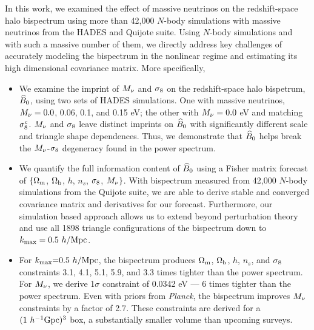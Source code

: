 In this work, we examined the effect of massive neutrinos on the redshift-space 
halo bispectrum using more than 42,000 $N$-body simulations with massive neutrinos
from the HADES and Quijote suite. Using $N$-body simulations and with such a massive 
number of them, we directly address key challenges of accurately modeling the 
bispectrum in the nonlinear regime and estimating its high dimensional covariance 
matrix. More specifically, 
\begin{itemize}
    \item We examine the imprint of $M_\nu$ and $\sigma_8$ on the redshift-space halo bispetrum, 
        $\widehat{B}_0$, using two sets of HADES simulations. One with massive neutrinos, $M_\nu = 0.0$, 0.06, 
        0.1, and 0.15 eV; the other with $M_\nu = 0.0$ eV and matching $\sigma_8^{c}$. 
        $M_\nu$ and $\sigma_8$ leave distinct imprints on $\widehat{B}_0$ with significantly different 
        scale and triangle shape dependences. Thus, we demonstrate that $\widehat{B}_0$ helps 
        break the $M_\nu$-$\sigma_8$ degeneracy found in the power spectrum. 
    \item We quantify the full information content of $\widehat{B}_0$ using a Fisher matrix forecast of 
        $\{\Omega_{\rm m}$, $\Omega_{\rm b}$, $h$, $n_s$, $\sigma_8$, $M_\nu\}$. With bispectrum measured from 42,000 
        $N$-body simulations from the Quijote suite, we are able to derive stable and converged 
        covariance matrix and derivatives for our forecast. Furthermore, our simulation 
        based approach allows us to extend beyond perturbation theory and use all 1898 
        triangle configurations of the bispectrum down to $k_{\rm max} = 0.5~h/{\rm Mpc}$.
    \item For $k_{\rm max}{=}0.5~h/{\rm Mpc}$, the bispectrum produces $\Omega_{\rm m}$, $\Omega_{\rm b}$, $h$, $n_s$, and 
        $\sigma_8$ constraints 3.1, 4.1, 5.1, 5.9, and 3.3 times tighter than the power spectrum. 
        For $M_\nu$, we derive 1$\sigma$ constraint of 0.0342 eV --- 6 times tighter than 
        the power spectrum. Even with priors from {\em Planck}, the bispectrum improves 
        $M_\nu$ constraints by a factor of 2.7. These constraints are derived for a 
        $(1~h^{-1}{\rm Gpc})^3$ box, a substantially smaller volume than upcoming surveys.
\end{itemize}

